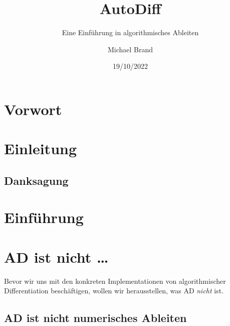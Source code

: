 \documentclass[
  letterpaper,
  DIV=11]{scrreprt}
\title{AutoDiff}
\subtitle{Eine Einführung in algorithmisches Ableiten}
\author{Michael Brand}
\date{19/10/2022}
\renewcommand*\contentsname{Inhaltsverzeichnis}
\newcommand\contentsname{Inhaltsverzeichnis}
\theoremstyle{definition}
\theoremstyle{remark}
\begin{document}
\maketitle
\ifdefined\Shaded\renewenvironment{Shaded}{\begin{tcolorbox}[sharp corners, breakable, frame hidden, boxrule=0pt, borderline west={3pt}{0pt}{shadecolor}, enhanced, interior hidden]}{\end{tcolorbox}}\fi

\renewcommand*\contentsname{Inhaltsverzeichnis}
{
\hypersetup{linkcolor=}
\setcounter{tocdepth}{2}
\tableofcontents
}

\hypertarget{vorwort}{%
\chapter*{Vorwort}\label{vorwort}}


\hypertarget{einleitung}{%
\chapter*{Einleitung}\label{einleitung}}

\hypertarget{danksagung}{%
\section*{Danksagung}\label{danksagung}}


\hypertarget{einfuxfchrung}{%
\chapter{Einführung}\label{einfuxfchrung}}


\hypertarget{ad-ist-nicht}{%
\chapter{AD ist nicht \ldots{}}\label{ad-ist-nicht}}

Bevor wir uns mit den konkreten Implementationen von algorithmischer
Differentiation beschäftigen, wollen wir herausstellen, was AD
\emph{nicht} ist.

\hypertarget{ad-ist-nicht-numerisches-ableiten}{%
\section{AD ist nicht numerisches
Ableiten}\label{ad-ist-nicht-numerisches-ableiten}}
\end{document}

